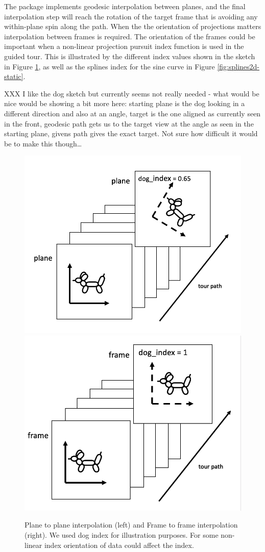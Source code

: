 The  package implements geodesic interpolation between planes, and the final interpolation step will reach the rotation of the target frame that is avoiding any within-plane spin along the path. When the the orientation of projections matters interpolation between frames is required. The orientation of the frames could be important when a non-linear projection pursuit index function is used in the guided tour. This is illustrated by the different index values shown in the sketch in Figure \ref{fig:dogs}, as well as the splines index for the sine curve in Figure \ref{fig:splines2d-static}.

XXX I like the dog sketch but currently seems not really needed - what would be nice would be showing a bit more here: starting plane is the dog looking in a different direction and also at an angle, target is the one aligned as currently seen in the front, geodesic path gets us to the target view at the angle as seen in the starting plane, givens path gives the exact target. Not sure how difficult it would be to make this though\ldots{}

\begin{figure}

{\centering \includegraphics[width=0.45\linewidth]{figures/plane} \includegraphics[width=0.45\linewidth]{figures/frame} 

}

\caption{Plane to plane interpolation (left) and Frame to frame interpolation (right). We used dog index for illustration purposes. For some non-linear index orientation of data could affect the index.}\label{fig:dogs}
\end{figure}

